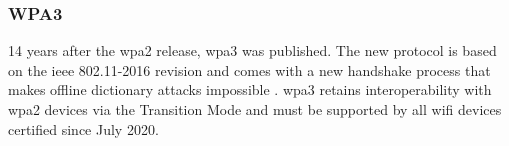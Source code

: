 \subsubsection{WPA3}

14 years after the \gls{wpa}2 release, \gls{wpa}3 was published. The new protocol is based on the \gls{ieee} 802.11-2016 revision and comes with a new handshake process that makes offline dictionary attacks impossible \cite{wpa3_spec}. \gls{wpa}3 retains interoperability with \gls{wpa}2 devices via the Transition Mode and must be supported by all \gls{wifi} devices certified since July 2020.




